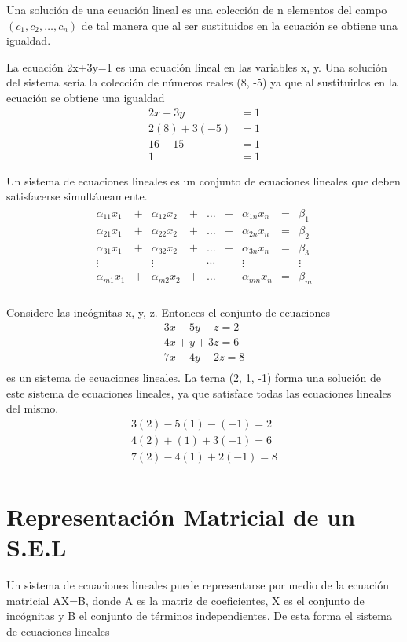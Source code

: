 Una solución de una ecuación lineal es una colección de n elementos del campo $(c_1, c_2, \hdots, c_n)$ de tal manera que al ser sustituidos en la ecuación se obtiene una igualdad. 
\begin{ejemplo}
La ecuación 2x+3y=1 es una ecuación lineal en las variables x, y. Una solución del sistema sería la colección de números reales (8, -5) ya que al sustituirlos en la ecuación se obtiene una igualdad
\begin{align*}
2x+3y&=1\\
2(8)+3(-5)&=1\\
16-15&=1\\
1&=1
\end{align*}
\end{ejemplo}
Un sistema de ecuaciones lineales es un conjunto de ecuaciones lineales que deben satisfacerse simultáneamente.
\begin{align*}
\begin{array}{ccccccccc}
    \alpha_{11} x_1&+&\alpha_{12} x_2&+&\hdots&+&\alpha_{1n} x_n&=&\beta_1\\
    \alpha_{21} x_1&+&\alpha_{22} x_2&+&\hdots&+&\alpha_{2n} x_n&=&\beta_2\\
    \alpha_{31} x_1&+&\alpha_{32} x_2&+&\hdots&+&\alpha_{3n} x_n&=&\beta_3\\
    \vdots&&\vdots&&\cdots&&\vdots&&\vdots\\
    \alpha_{m1} x_1&+&\alpha_{m2} x_2&+&\hdots&+&\alpha_{mn} x_n&=&\beta_m\\
\end{array}
\end{align*} 
\begin{ejemplo}
Considere las incógnitas x, y, z. Entonces el conjunto de ecuaciones
\begin{align*}
3x-5y-z=2\\
4x+y+3z=6\\
7x-4y+2z=8\\
\end{align*}
es un sistema de ecuaciones lineales. La terna (2, 1, -1) forma una solución de este sistema de ecuaciones lineales, ya que satisface todas las ecuaciones lineales del mismo.
\begin{align*}
3(2)-5(1)-(-1)=2\\
4(2)+(1)+3(-1)=6\\
7(2)-4(1)+2(-1)=8\\
\end{align*}
\end{ejemplo}

\section{Representación Matricial de un S.E.L}
Un sistema de ecuaciones lineales puede representarse por medio de la ecuación matricial AX=B, donde A es la matriz de coeficientes, X es el conjunto de incógnitas y B el conjunto de términos independientes. De esta forma el sistema de ecuaciones lineales

